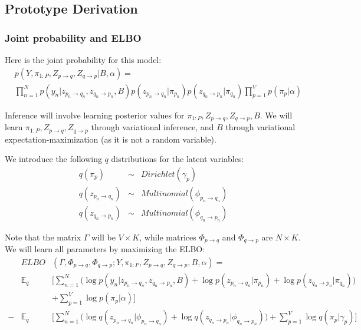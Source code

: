 \subsection{Prototype Derivation}
\label{sec:mmsb_appendix}

\subsubsection{Joint probability and ELBO}

Here is the joint probability for this model:
\begin{eqnarray*}
&p(Y, \pi_{1:P}, Z_{p \rightarrow q}, Z_{q \rightarrow p} | B, \alpha) = \\
&\prod_{n=1}^N p(y_n | z_{p_n \rightarrow q_n}, z_{q_n \rightarrow p_n} , B)
p(z_{p_n \rightarrow q_n} | \pi_{p_n}) p(z_{q_n \rightarrow p_n} | \pi_{q_n})
\prod_{p = 1}^V p(\pi_p| \alpha)
\end{eqnarray*}

Inference will involve learning posterior values for $\pi_{1:P}, Z_{p \rightarrow q}, Z_{q \rightarrow p}, B$.
We will learn $\pi_{1:P}, Z_{p \rightarrow q}, Z_{q \rightarrow p}$ through variational inference, and $B$ through variational expectation-maximization (as it is not a random variable).

We introduce the following $	q$ distributions for the latent variables:
\begin{eqnarray*}
q(\pi_p) &\sim& Dirichlet(\gamma_p) \\ 
q(z_{p_n \rightarrow q_n}) &\sim& Multinomial(\phi_{p_n \rightarrow q_n}) \\
q(z_{q_n \rightarrow p_n}) &\sim& Multinomial(\phi_{q_n \rightarrow p_n}) 
\end{eqnarray*}

Note that the matrix $\Gamma$ will be $V \times K$, while matrices $\Phi_{p \rightarrow q}$ and $\Phi_{q \rightarrow p}$ are $N \times K$.
We will learn all parameters by maximizing the ELBO:
\begin{eqnarray*}
&ELBO&(\Gamma,\Phi_{p \rightarrow q},\Phi_{q \rightarrow p};Y, \pi_{1:P}, Z_{p \rightarrow q}, Z_{q \rightarrow p},B,\alpha) = \\
&\mathbb{E}_q&\bigg[\sum_{n=1}^N \bigg(\log p(y_n | z_{p_n \rightarrow q_n}, z_{q_n \rightarrow p_n} , B)
+ \log p(z_{p_n \rightarrow q_n} | \pi_{p_n})
+ \log p(z_{q_n \rightarrow p_n} | \pi_{q_n})\bigg) \\
&&+ \sum_{p = 1}^V \log p(\pi_p| \alpha)\bigg] \\
- &\mathbb{E}_q&\bigg[\sum_{n=1}^N \bigg( \log q(z_{p_n \rightarrow q_n} | \phi_{p_n \rightarrow q_n})
+ \log q(z_{q_n \rightarrow p_n} | \phi_{q_n \rightarrow p_n})\bigg) 
+ \sum_{p = 1}^V \log q(\pi_p| \gamma_p)\bigg]
\end{eqnarray*}

